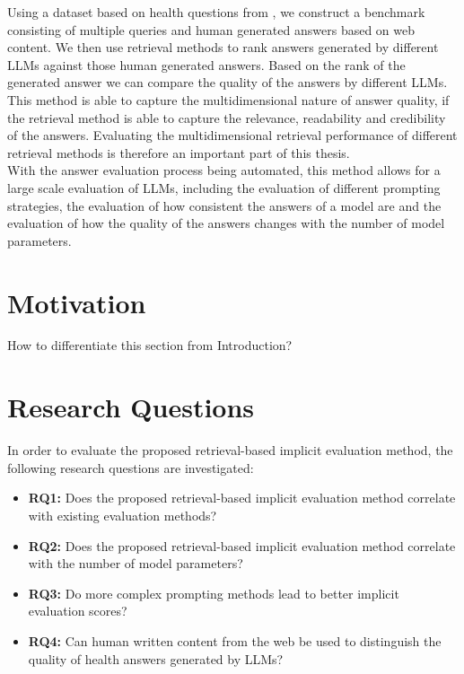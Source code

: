 Using a dataset based on health questions from \cite{goeuriot:2021:Consumer}, we construct a benchmark consisting of multiple queries and human generated answers based on web content.
We then use retrieval methods to rank answers generated by different LLMs against those human generated answers.
Based on the rank of the generated answer we can compare the quality of the answers by different LLMs.
This method is able to capture the multidimensional nature of answer quality, if the retrieval method is able to capture the relevance, readability and credibility of the answers.
Evaluating the multidimensional retrieval performance of different retrieval methods is therefore an important part of this thesis.
\\
With the answer evaluation process being automated, this method allows for a large scale evaluation of LLMs, including the evaluation of different prompting strategies, the evaluation of how consistent the answers of a model are and the evaluation of how the quality of the answers changes with the number of model parameters.

\section{Motivation}\label{sec:motivation}
How to differentiate this section from Introduction?

\section{Research Questions}\label{sec:research-question}
In order to evaluate the proposed retrieval-based implicit evaluation method, the following research questions are investigated:
\begin{itemize}
    \item \textbf{RQ1:} Does the proposed retrieval-based implicit evaluation method correlate with existing evaluation methods?
    \item \textbf{RQ2:} Does the proposed retrieval-based implicit evaluation method correlate with the number of model parameters?
    \item \textbf{RQ3:} Do more complex prompting methods lead to better implicit evaluation scores?
    \item \textbf{RQ4:} Can human written content from the web be used to distinguish the quality of health answers generated by LLMs?
\end{itemize}


